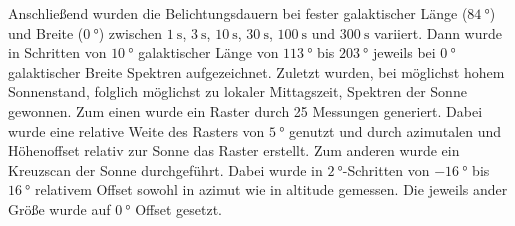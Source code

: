 Anschließend wurden die Belichtungsdauern bei fester galaktischer Länge ($\SI{84}{\degree}$) und Breite ($\SI{0}{\degree}$) zwischen $\SI{1}{\second}$, $\SI{3}{\second}$, $\SI{10}{\second}$, $\SI{30}{\second}$, $\SI{100}{\second}$ und $\SI{300}{\second}$ variiert.
Dann wurde in Schritten von $\SI{10}{\degree}$ galaktischer Länge von $\SI{113}{\degree}$ bis $\SI{203}{\degree}$ jeweils bei $\SI{0}{\degree}$ galaktischer Breite Spektren aufgezeichnet.
Zuletzt wurden, bei möglichst hohem Sonnenstand, folglich möglichst zu lokaler Mittagszeit, Spektren der Sonne gewonnen.
Zum einen wurde ein Raster durch 25 Messungen generiert.
Dabei wurde eine relative Weite des Rasters von $\SI{5}{\degree}$ genutzt und durch azimutalen und Höhenoffset relativ zur Sonne das Raster erstellt.
Zum anderen wurde ein Kreuzscan der Sonne durchgeführt.
Dabei wurde in $\SI{2}{\degree}$-Schritten von $\SI{-16}{\degree}$ bis $\SI{16}{\degree}$ relativem Offset sowohl in azimut wie in altitude gemessen. Die jeweils ander Größe wurde auf $\SI{0}{\degree}$ Offset gesetzt.